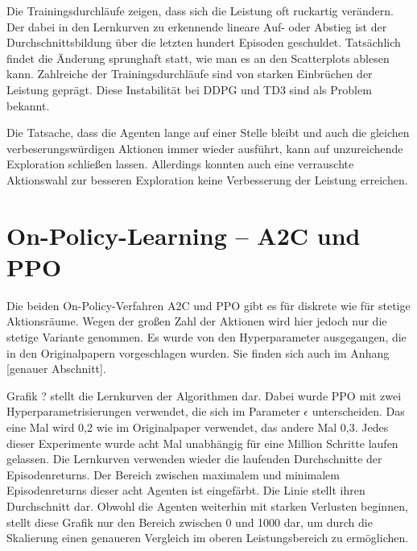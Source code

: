 Die Trainingsdurchläufe zeigen, dass sich die Leistung oft ruckartig verändern.
Der dabei in den Lernkurven zu erkennende lineare Auf- oder Abstieg ist der Durchschnittsbildung über die letzten hundert Episoden geschuldet.
Tatsächlich findet die Änderung sprunghaft statt, wie man es an den Scatterplots ablesen kann.
Zahlreiche der Trainingsdurchläufe sind von starken Einbrüchen der Leistung geprägt.
Diese Instabilität bei DDPG und TD3 sind als Problem bekannt.

Die Tatsache, dass die Agenten lange auf einer Stelle bleibt und auch die gleichen verbeserungswürdigen Aktionen immer wieder ausführt, kann auf unzureichende Exploration schließen lassen.
Allerdings konnten auch eine verrauschte Aktionswahl zur besseren Exploration keine Verbesserung der Leistung erreichen.

\section{On-Policy-Learning -- A2C und PPO}
Die beiden On-Policy-Verfahren A2C und PPO gibt es für diskrete wie für stetige Aktionsräume.
Wegen der großen Zahl der Aktionen wird hier jedoch nur die stetige Variante genommen.
Es wurde von den Hyperparameter ausgegangen, die in den Originalpapern vorgeschlagen wurden.
Sie finden sich auch im Anhang [genauer Abschnitt].

Grafik ? stellt die Lernkurven der Algorithmen dar.
Dabei wurde PPO mit zwei Hyperparametrisierungen verwendet, die sich im Parameter $\epsilon$ unterscheiden.
Das eine Mal wird 0,2 wie im Originalpaper verwendet, das andere Mal 0,3.
Jedes dieser Experimente wurde acht Mal unabhängig für eine Million Schritte laufen gelassen.
Die Lernkurven verwenden wieder die laufenden Durchschnitte der Episodenreturns.
Der Bereich zwischen maximalem und minimalem Episodenreturns dieser acht Agenten ist eingefärbt.
Die Linie stellt ihren Durchschnitt dar.
Obwohl die Agenten weiterhin mit starken Verlusten beginnen, stellt diese Grafik nur den Bereich zwischen 0 und 1000 dar, um durch die Skalierung einen genaueren Vergleich im oberen Leistungsbereich zu ermöglichen.

